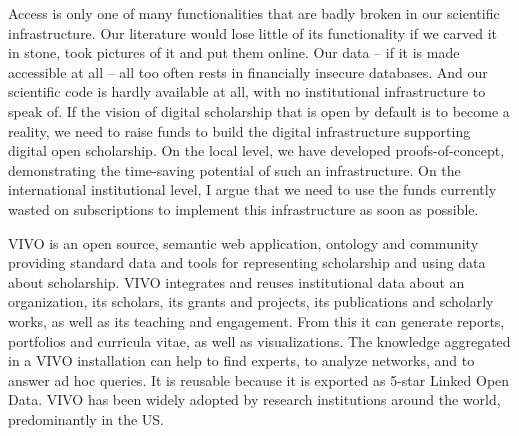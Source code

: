 \documentclass[a4paper,USenglish]{dagrep}
\begin{document}
{}
\license
{}
Access is only one of many functionalities that are badly broken in our
scientific infrastructure. Our literature would lose little of its functionality
if we carved it in stone, took pictures of it and put them online. Our data – if
it is made accessible at all – all too often rests in financially insecure
databases. And our scientific code is hardly available at all, with no
institutional infrastructure to speak of. If the vision of digital scholarship
that is open by default is to become a reality, we need to raise funds to build
the digital infrastructure supporting digital open scholarship. On the local
level, we have developed proofs-of-concept, demonstrating the time-saving
potential of such an infrastructure. On the international institutional level, I
argue that we need to use the funds currently wasted on subscriptions to
implement this infrastructure as soon as possible.

  
{}
\license

VIVO is an open source, semantic web application, ontology and community providing standard data and tools for representing scholarship and using data about scholarship.
VIVO integrates and reuses institutional data about an organization, its scholars, its grants and projects, its publications and scholarly works, as well as its teaching and engagement.
From this it can generate reports, portfolios and curricula vitae, as well as visualizations.
The knowledge aggregated in a VIVO installation can help to find experts, to analyze networks, and to answer ad hoc queries.
It is reusable because it is exported as 5-star Linked Open Data.
VIVO has been widely adopted by research institutions around the world, predominantly in the US.
\end{document}
